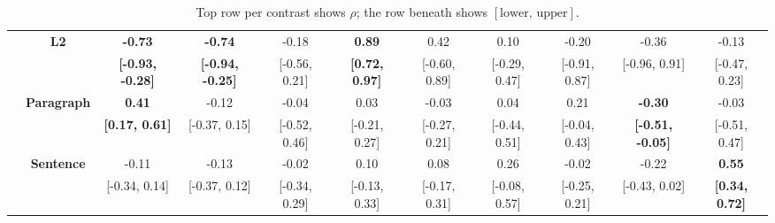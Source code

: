 \begin{table}[ht]
{{\begin{tabular}{@{}>{\centering\arraybackslash}m{0.9cm}@{}c ccccccccc@{}}
\\
\addlinespace[6pt]
 & \multirow{2}{*}{\textbf{L2}} & \rule{0pt}{2.2ex} \textbf{-0.73} & \textbf{-0.74} & -0.18 & \textbf{0.89} & 0.42 & 0.10 & -0.20 & -0.36 & -0.13
\\
 &  & \rule{0pt}{2.2ex} \textbf{[-0.93, -0.28]} & \textbf{[-0.94, -0.25]} & [-0.56, 0.21] & \textbf{[0.72, 0.97]} & [-0.60, 0.89] & [-0.29, 0.47] & [-0.91, 0.87] & [-0.96, 0.91] & [-0.47, 0.23]
\\
\multirow{4}{*}{\centering\rotatebox[origin=c]{90}{\textbf{HKC}}} & \multirow{2}{*}{\textbf{Paragraph}} & \rule{0pt}{2.2ex} \textbf{0.41} & -0.12 & -0.04 & 0.03 & -0.03 & 0.04 & 0.21 & \textbf{-0.30} & -0.03
\\
 &  & \rule{0pt}{2.2ex} \textbf{[0.17, 0.61]} & [-0.37, 0.15] & [-0.52, 0.46] & [-0.21, 0.27] & [-0.27, 0.21] & [-0.44, 0.51] & [-0.04, 0.43] & \textbf{[-0.51, -0.05]} & [-0.51, 0.47]
\\
\addlinespace[6pt]
 & \multirow{2}{*}{\textbf{Sentence}} & \rule{0pt}{2.2ex} -0.11 & -0.13 & -0.02 & 0.10 & 0.08 & 0.26 & -0.02 & -0.22 & \textbf{0.55}
\\
 &  & \rule{0pt}{2.2ex} [-0.34, 0.14] & [-0.37, 0.12] & [-0.34, 0.29] & [-0.13, 0.33] & [-0.17, 0.31] & [-0.08, 0.57] & [-0.25, 0.21] & [-0.43, 0.02] & \textbf{[0.34, 0.72]}
\\
\bottomrule
\end{tabular}
}%
}%
\caption{Top row per contrast shows $\rho$; the row beneath shows $[\text{lower},\,\text{upper}]$.}
\label{cor_behav_meas}
\end{table}

